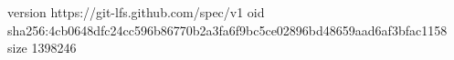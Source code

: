 version https://git-lfs.github.com/spec/v1
oid sha256:4cb0648dfc24cc596b86770b2a3fa6f9bc5ce02896bd48659aad6af3bfac1158
size 1398246
